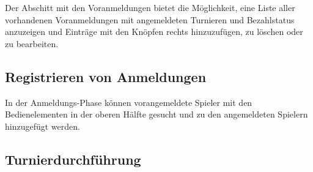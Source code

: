 \documentclass[11pt]{article}
\begin{document}
\vspace{1cm}

Der Abschitt mit den Voranmeldungen bietet die Möglichkeit, eine Liste aller vorhandenen Voranmeldungen mit angemeldeten Turnieren und Bezahlstatus anzuzeigen und Einträge mit den Knöpfen rechts hinzuzufügen, zu löschen oder zu bearbeiten.

\subsection{Registrieren von Anmeldungen}


\vspace{1cm}

In der Anmeldungs-Phase können vorangemeldete Spieler mit den Bedienelementen in der oberen Hälfte gesucht und zu den angemeldeten Spielern hinzugefügt werden.

\subsection{Turnierdurchführung}

\end{document}
